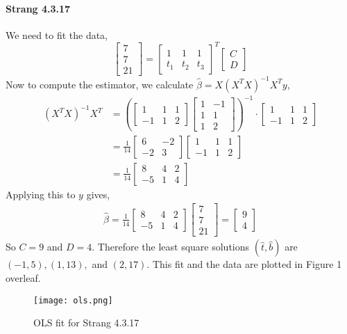 \documentclass[10pt]{article}
\begin{document}
\paragraph{Strang 4.3.17} We need to fit the data,
\[\begin{bmatrix}7\\7\\21\end{bmatrix} = \begin{bmatrix}1&1&1\\t_1&t_2&t_3\end{bmatrix}^T\begin{bmatrix}C\\D\end{bmatrix}\] Now to compute the estimator, we calculate $\hat{\beta}=X(X^T X)^{-1}X^T y$,
\begin{align*}
	(X^T X)^{-1}X^T&= \left(\begin{bmatrix}1&1&1\\-1&1&2\end{bmatrix} \begin{bmatrix}1&-1\\1&1\\1&2\end{bmatrix}\right)^{-1}\cdot\begin{bmatrix}1&1&1\\-1&1&2\end{bmatrix}\\
	&= \frac{1}{14}\begin{bmatrix}6& -2\\-2& 3\end{bmatrix}\begin{bmatrix}1&1&1\\-1&1&2\end{bmatrix}\\
	&= \frac{1}{14}\begin{bmatrix}8& 4& 2\\ -5& 1& 4\end{bmatrix}
\end{align*}
Applying this to $y$ gives,
\begin{align*}
	\hat{\beta} = \frac{1}{14}\begin{bmatrix}8& 4& 2\\ -5& 1& 4\end{bmatrix}\begin{bmatrix}7\\7\\21\end{bmatrix} = \begin{bmatrix}9\\4\end{bmatrix}
\end{align*}
So $C=9$ and $D=4$. Therefore the least square solutions $(\hat{t},\hat{b})$ are $(-1, 5), (1,13),$ and $(2,17)$. This fit and the data are plotted in Figure 1 overleaf.
\begin{figure}
\begin{center}
\texttt{[image: ols.png]}
\end{center}
\caption{OLS fit for Strang 4.3.17}
\end{figure}
\end{document}
